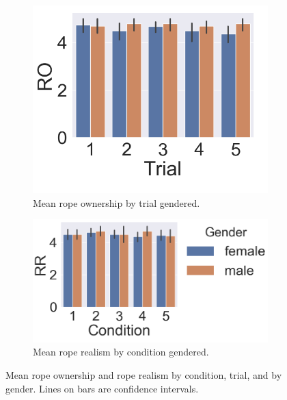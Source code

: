 \begin{figure}[H]
\begin{subfigure}[b]{0.3\textwidth}
     \includegraphics[scale=0.3]{Files/Plots/rotrial_gen.png}
      \caption{Mean rope ownership by trial gendered.}
     \label{fig:ropeOwnTrialGend}
 \end{subfigure}
  \hspace{5mm}
  \begin{subfigure}[b]{0.3\textwidth}
     \centering
     \includegraphics[scale=0.35]{Files/Plots/rrcond_gen.png}
     \caption{Mean rope realism by condition gendered.}
     \label{fig:ropeRealCondGend}
 \end{subfigure}
     \caption{Mean rope ownership and rope realism by condition, trial, and by gender. Lines on bars are confidence intervals.}
    \label{fig:ropeOwnershipRealism}
\end{figure}



